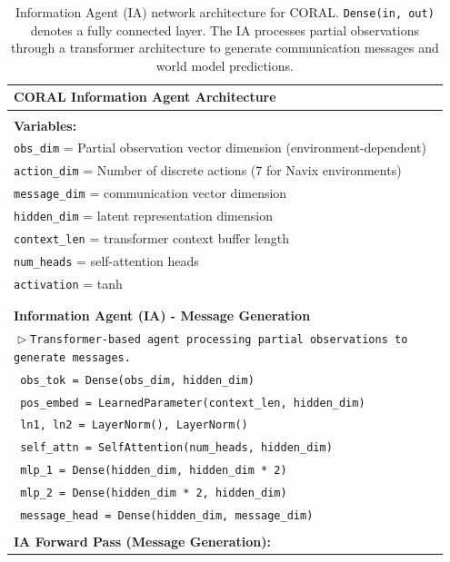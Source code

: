 \documentclass[letterpaper]{article} %
\begin{document}
\begin{appendix}
\begin{table}[!htbp]
\centering
\caption{Information Agent (IA) network architecture for CORAL. \texttt{Dense(in, out)} denotes a fully connected layer. The IA processes partial observations through a transformer architecture to generate communication messages and world model predictions.}
\label{tab:coral_ia_architecture}
\begin{tabular}{@{}p{0.95\linewidth}@{}}
\toprule[\heavyrulewidth]
\textbf{CORAL Information Agent Architecture} \\
\midrule
\\
\textbf{Variables:} \\
\texttt{obs\_dim} = Partial observation vector dimension (environment-dependent) \\
\texttt{action\_dim} = Number of discrete actions (7 for Navix environments) \\
\texttt{message\_dim} = communication vector dimension \\
\texttt{hidden\_dim} = latent representation dimension \\
\texttt{context\_len} = transformer context buffer length \\
\texttt{num\_heads} = self-attention heads \\
\texttt{activation} = tanh \\
\\ \hline \\
\textbf{Information Agent (IA) - Message Generation} \\
\texttt{$\vartriangleright$\hspace{0.5em}Transformer-based agent processing partial observations to generate messages.} \\
\texttt{  obs\_tok = Dense(obs\_dim, hidden\_dim)} \\
\texttt{  pos\_embed = LearnedParameter(context\_len, hidden\_dim)} \\
\texttt{  ln1, ln2 = LayerNorm(), LayerNorm()} \\
\texttt{  self\_attn = SelfAttention(num\_heads, hidden\_dim)} \\
\texttt{  mlp\_1 = Dense(hidden\_dim, hidden\_dim * 2)} \\
\texttt{  mlp\_2 = Dense(hidden\_dim * 2, hidden\_dim)} \\
\texttt{  message\_head = Dense(hidden\_dim, message\_dim)} \\
\\
\textbf{IA Forward Pass (Message Generation):} \\

\end{tabular}
\end{table}
\end{appendix}
\end{document}
